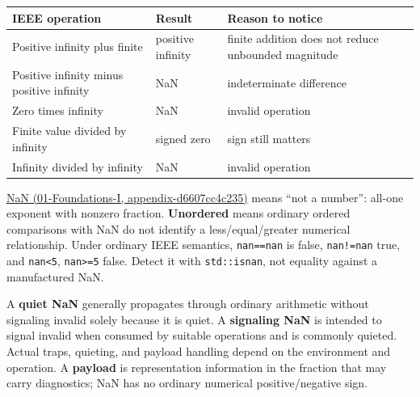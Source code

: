 {\def\LTcaptype{none} %
\begin{longtable}[]{@{}
  >{\raggedright\arraybackslash}p{}
  >{\raggedright\arraybackslash}p{}
  >{\raggedright\arraybackslash}p{}@{}}
\toprule\noalign{}
\begin{minipage}[b]{\linewidth}\raggedright
IEEE operation
\end{minipage} & \begin{minipage}[b]{\linewidth}\raggedright
Result
\end{minipage} & \begin{minipage}[b]{\linewidth}\raggedright
Reason to notice
\end{minipage} \\
\midrule\noalign{}
\endhead
\bottomrule\noalign{}
\endlastfoot
Positive infinity plus finite & positive infinity & finite addition does not reduce unbounded magnitude \\
Positive infinity minus positive infinity & NaN & indeterminate difference \\
Zero times infinity & NaN & invalid operation \\
Finite value divided by infinity & signed zero & sign still matters \\
Infinity divided by infinity & NaN & invalid operation \\
\end{longtable}
}

\href{../01-Foundations-I/main.pdf\#nameddest=appendix-d6607cc4c235}{NaN (01-Foundations-I, appendix-d6607cc4c235)} means ``not a number'': all-one exponent with nonzero fraction. \textbf{Unordered} means ordinary ordered comparisons with NaN do not identify a less/equal/greater numerical relationship. Under ordinary IEEE semantics, \texttt{nan==nan} is false, \texttt{nan!=nan} true, and \texttt{nan\textless{}5}, \texttt{nan\textgreater{}=5} false. Detect it with \texttt{std::isnan}, not equality against a manufactured NaN.

A \textbf{quiet NaN} generally propagates through ordinary arithmetic without signaling invalid solely because it is quiet. A \textbf{signaling NaN} is intended to signal invalid when consumed by suitable operations and is commonly quieted. Actual traps, quieting, and payload handling depend on the environment and operation. A \textbf{payload} is representation information in the fraction that may carry diagnostics; NaN has no ordinary numerical positive/negative sign.

